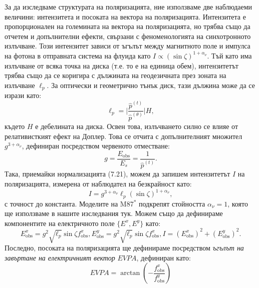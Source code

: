 За да изследваме структурата на поляризацията, ние използваме две наблюдаеми величини: интензитета и посоката на вектора на поляризацията. Интензитета е пропорционален на големината на вектора на поляризацията, но трябва също да отчетем и допълнителни ефекти, свързани с феноменологията на синхотронното излъчване. Този интензитет зависи от ъгълът между магнитното поле и импулса на фотона в отправната система на флуида като $I\propto(\sin\zeta)^{1 + \alpha_\nu}$. Тъй като има излъчване от всяка точка на диска (т.е. то е на единица обем), интензитетът трябва също да се коригира с дължината на геодезичната през зоната на излъчване $\ell_p$. За оптически и геометрично тънък диск, тази дължина може да се изрази като:
\begin{equation}
	\ell_p = \bigg\vert\frac{\hat{p}^{(t)}}{\hat{p}^{(\theta)}}\bigg\vert H,
\end{equation}
където $H$ е дебелината на диска. Освен това, излъчването силно се влияе от релативисткият ефект на Доплер. Това се отчита с допълнителният множител $g^{3 + \alpha_\nu}$, дефиниран посредством червеното отместване:
\begin{equation}
	g = \frac{E_\text{obs}}{E_s} = \frac{1}{\hat{p}^{(t)}}.
\end{equation}
Така, приемайки нормализацията (7.21), можем да запишем интензитетът $I$ на поляризацията, измерена от наблюдател на безкрайност като:
\begin{equation}
	I = g^{3 + \alpha_\nu}\ell_p(\sin\zeta)^{1 + \alpha_\nu},
\end{equation}
с точност до константа. Моделите на M87$^*$ подкрепят стойността $\alpha_\nu = 1$, която ще използваме в нашите изследвания тук. Можем също да дефинираме компонентите на електричното поле $\{E^x, E^y\}$ като:
\begin{subequations}
	\begin{equation}
		E^x_{\text{obs}} = g^2\sqrt{\ell_p}\sin\zeta f^x_\text{obs},
	\end{equation}
	\begin{equation}
		E^y_\text{obs} = g^2\sqrt{\ell_p}\sin\zeta f^x_\text{obs},
	\end{equation}
	\begin{equation}
		I = (E^x_\text{obs})^2 + (E^y_\text{obs})^2.
	\end{equation}
\end{subequations}
Последно, посоката на поляризацията ще дефинираме посредством \emph{ъгълът на завъртане на електричният вектор} $EVPA$, дефиниран като:
\begin{equation}
	EVPA = \arctan\left(-\frac{f^x_\text{obs}}{f^y_\text{obs}}\right)
\end{equation}

